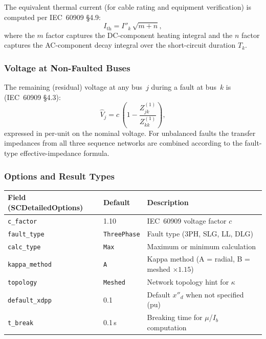 The equivalent thermal current (for cable rating and equipment
verification) is computed per IEC~60909 \S4.9:
\begin{equation}
  I_{\text{th}} = I''_k\,\sqrt{m + n},
  \label{eq:sc-Ith}
\end{equation}
where the $m$ factor captures the DC-component heating integral and
the $n$ factor captures the AC-component decay integral over the
short-circuit duration $T_k$.

\subsubsection{Voltage at Non-Faulted Buses}

The remaining (residual) voltage at any bus~$j$ during a fault at
bus~$k$ is (IEC~60909 \S4.3):
\begin{equation}
  \hat{V}_j = c\,\left(1 - \frac{Z_{jk}^{(1)}}{Z_{kk}^{(1)}}\right),
  \label{eq:sc-Vrem}
\end{equation}
expressed in per-unit on the nominal voltage.  For unbalanced faults
the transfer impedances from all three sequence networks are combined
according to the fault-type effective-impedance formula.

\subsubsection{Options and Result Types}

\begin{center}
\begin{tabular}{lll}
\hline\hline
\textbf{Field (SCDetailedOptions)} & \textbf{Default} & \textbf{Description} \\
\hline
\texttt{c\_factor} & 1.10 & IEC~60909 voltage factor $c$ \\
\texttt{fault\_type} & \texttt{ThreePhase} & Fault type (3PH, SLG, LL, DLG) \\
\texttt{calc\_type} & \texttt{Max} & Maximum or minimum calculation \\
\texttt{kappa\_method} & \texttt{A} & Kappa method (A = radial, B = meshed $\times 1.15$) \\
\texttt{topology} & \texttt{Meshed} & Network topology hint for $\kappa$ \\
\texttt{default\_xdpp} & 0.1 & Default $x''_d$ when not specified (pu) \\
\texttt{t\_break} & 0.1\,s & Breaking time for $\mu$/$I_b$ computation \\
\hline\hline
\end{tabular}
\end{center}

